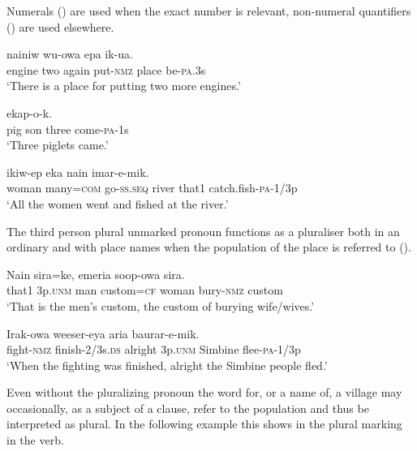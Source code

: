 Numerals () are used when the exact number is relevant, non-numeral quantifiers () are used elsewhere.  

\ea%
\label{ex:6:x1286}
\gll {}   nainiw  wu-owa  epa  ik-ua. \\
engine  two  again  put-\textsc{nmz}  place  be-\textsc{pa}.3s\\
\glt `There is a place for putting two more engines.'
\z

\ea%
\label{ex:6:x1308}
\gll {}     ekap-o-k. \\
pig  son  three  come-\textsc{pa}-1s\\
\glt `Three piglets came.'
\z

\ea%
\label{ex:6:x1287}
\gll {}    ikiw-ep  eka  nain  imar-e-mik. \\
woman  many=\textsc{com}  go-\textsc{ss}.\textsc{seq}  river  that1  catch.fish-\textsc{pa}-1/3p\\
\glt `All the women went and fished at the river.'
\z

The third person plural unmarked pronoun functions as a pluraliser both in an ordinary  and with place names when the population of the place is referred to (). 

\ea%
\label{ex:6:x1288}
\gll Nain     sira=ke,  emeria  soop-owa  sira. \\
that1  3p.\textsc{unm}  man  custom=\textsc{cf}  woman  bury-\textsc{nmz}  custom\\
\glt `That is the men's custom, the custom of burying wife/wives.'
\z

\ea%
\label{ex:6:x1289}
\gll Irak-owa  weeser-eya  aria     baurar-e-mik.\\
fight-\textsc{nmz}  finish-2/3s.\textsc{ds}  alright  3p.\textsc{unm}  Simbine flee-\textsc{pa}-1/3p\\
\glt `When the fighting was finished, alright the Simbine people fled.'
\z

Even without the pluralizing pronoun the word for, or a name of, a village may occasionally, as a subject of a clause, refer to the population and thus be interpreted as plural. In the following example this shows in the plural marking in the verb. 


